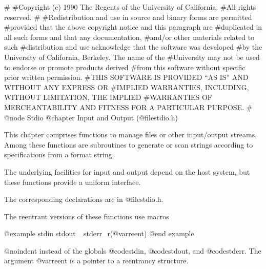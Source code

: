 #
#Copyright (c) 1990 The Regents of the University of California.
#All rights reserved.
#
#Redistribution and use in source and binary forms are permitted
#provided that the above copyright notice and this paragraph are
#duplicated in all such forms and that any documentation,
#and/or other materials related to such
#distribution and use acknowledge that the software was developed
#by the University of California, Berkeley.  The name of the
#University may not be used to endorse or promote products derived
#from this software without specific prior written permission.
#THIS SOFTWARE IS PROVIDED ``AS IS'' AND WITHOUT ANY EXPRESS OR
#IMPLIED WARRANTIES, INCLUDING, WITHOUT LIMITATION, THE IMPLIED
#WARRANTIES OF MERCHANTABILITY AND FITNESS FOR A PARTICULAR PURPOSE.
#
@node Stdio
@chapter Input and Output (@file{stdio.h})

This chapter comprises functions to manage files
or other input/output streams. Among these functions are subroutines
to generate or scan strings according to specifications from a format string.

The underlying facilities for input and output depend on the host
system, but these functions provide a uniform interface.

The corresponding declarations are in @file{stdio.h}.

The reentrant versions of these functions use macros

@example
stdin
stdout
_stderr_r(@var{reent})
@end example

@noindent
instead of the globals @code{stdin}, @code{stdout}, and
@code{stderr}.  The argument @var{reent} is a pointer to a reentrancy
structure.


